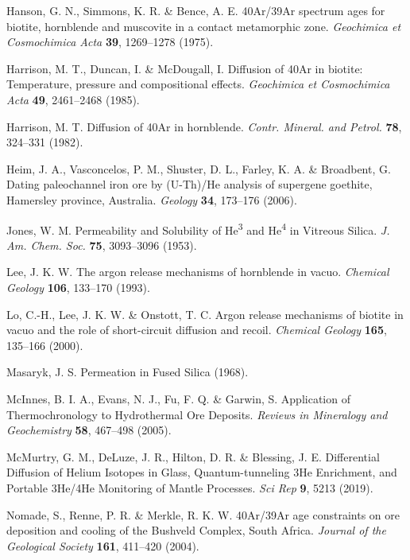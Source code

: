 \documentclass[gchron, manuscript]{copernicus}
\begin{document}
\begin{thebibliography}{}
Hanson, G. N., Simmons, K. R. \& Bence, A. E. 40Ar/39Ar spectrum ages for biotite, hornblende and muscovite in a contact metamorphic zone. \emph{Geochimica et Cosmochimica Acta} \textbf{39}, 1269--1278 (1975).

Harrison, M. T., Duncan, I. \& McDougall, I. Diffusion of 40Ar in biotite: Temperature, pressure and compositional effects. \emph{Geochimica et Cosmochimica Acta} \textbf{49}, 2461--2468 (1985).

Harrison, M. T. Diffusion of 40Ar in hornblende. \emph{Contr. Mineral. and Petrol.} \textbf{78}, 324--331 (1982).

Heim, J. A., Vasconcelos, P. M., Shuster, D. L., Farley, K. A. \& Broadbent, G. Dating paleochannel iron ore by (U-Th)/He analysis of supergene goethite, Hamersley province, Australia. \emph{Geology} \textbf{34}, 173--176 (2006).

Jones, W. M. Permeability and Solubility of He\textsuperscript{3} and He\textsuperscript{4} in Vitreous Silica. \emph{J. Am. Chem. Soc.} \textbf{75}, 3093--3096 (1953).

Lee, J. K. W. The argon release mechanisms of hornblende in vacuo. \emph{Chemical Geology} \textbf{106}, 133--170 (1993).

Lo, C.-H., Lee, J. K. W. \& Onstott, T. C. Argon release mechanisms of biotite in vacuo and the role of short-circuit diffusion and recoil. \emph{Chemical Geology} \textbf{165}, 135--166 (2000).

Masaryk, J. S. Permeation in Fused Silica (1968).

McInnes, B. I. A., Evans, N. J., Fu, F. Q. \& Garwin, S. Application of Thermochronology to Hydrothermal Ore Deposits. \emph{Reviews in Mineralogy and Geochemistry} \textbf{58}, 467--498 (2005).

McMurtry, G. M., DeLuze, J. R., Hilton, D. R. \& Blessing, J. E. Differential Diffusion of Helium Isotopes in Glass, Quantum-tunneling 3He Enrichment, and Portable 3He/4He Monitoring of Mantle Processes. \emph{Sci Rep} \textbf{9}, 5213 (2019).

Nomade, S., Renne, P. R. \& Merkle, R. K. W. 40Ar/39Ar age constraints on ore deposition and cooling of the Bushveld Complex, South Africa. \emph{Journal of the Geological Society} \textbf{161}, 411--420 (2004).


\end{thebibliography}
\end{document}
